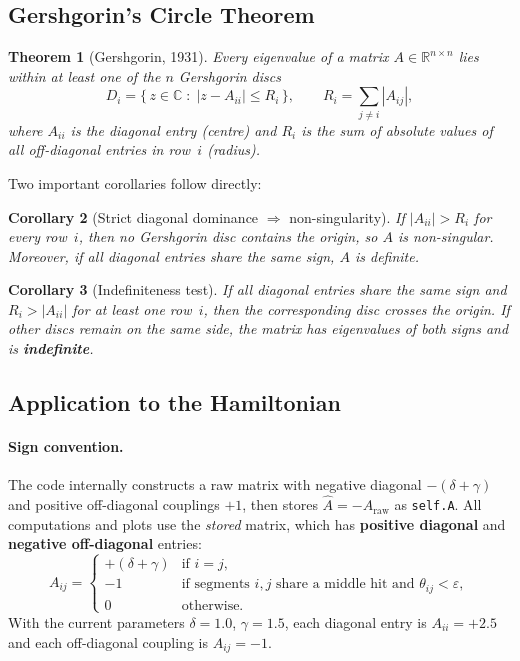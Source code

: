 \documentclass[12pt,a4paper]{article}
\newtheorem{theorem}{Theorem}
\newtheorem{corollary}[theorem]{Corollary}
\begin{document}
\subsection{Gershgorin's Circle Theorem}
\label{sec:theory_gershgorin}

\begin{theorem}[Gershgorin, 1931]
Every eigenvalue of a matrix $A \in \mathbb{R}^{n\times n}$ lies within at
least one of the $n$ \emph{Gershgorin discs}
\begin{equation}
  D_i = \bigl\{\, z \in \mathbb{C} \;:\; |z - A_{ii}| \leq R_i \,\bigr\},
  \qquad
  R_i = \sum_{j \neq i} |A_{ij}|,
  \label{eq:gershgorin}
\end{equation}
where $A_{ii}$ is the diagonal entry (\emph{centre}) and $R_i$ is the sum
of absolute values of all off-diagonal entries in row~$i$ (\emph{radius}).
\end{theorem}

\noindent Two important corollaries follow directly:

\begin{corollary}[Strict diagonal dominance $\Rightarrow$ non-singularity]
If $|A_{ii}| > R_i$ for every row~$i$, then no Gershgorin disc contains
the origin, so $A$ is non-singular.
Moreover, if all diagonal entries share the same sign, $A$ is
\emph{definite}.
\end{corollary}

\begin{corollary}[Indefiniteness test]
If all diagonal entries share the same sign and $R_i > |A_{ii}|$ for at least
one row~$i$, then the corresponding disc crosses the origin.
If other discs remain on the same side, the matrix has
eigenvalues of both signs and is \textbf{indefinite}.
\end{corollary}

\subsection{Application to the Hamiltonian}
\label{sec:theory_hamiltonian}

\paragraph{Sign convention.}
The code internally constructs a raw matrix with negative diagonal
$-(\delta+\gamma)$ and positive off-diagonal couplings $+1$, then stores
$\hat{A} = -A_\text{raw}$ as \texttt{self.A}.
All computations and plots use the \emph{stored} matrix, which has
\textbf{positive diagonal} and \textbf{negative off-diagonal} entries:
\begin{equation}
  A_{ij} = \begin{cases}
    +(\delta + \gamma) & \text{if } i = j, \\[3pt]
    -1 & \text{if segments } i,j \text{ share a middle hit and }
         \theta_{ij} < \varepsilon, \\[3pt]
    0  & \text{otherwise.}
  \end{cases}
  \label{eq:hamiltonian_entries}
\end{equation}
With the current parameters $\delta = 1.0$, $\gamma = 1.5$, each diagonal
entry is $A_{ii} = +2.5$ and each off-diagonal coupling is $A_{ij} = -1$.
\end{document}
